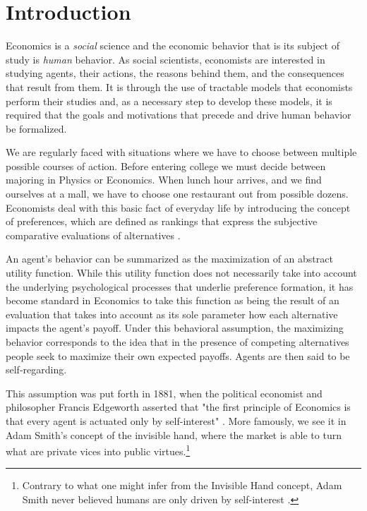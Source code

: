 \documentclass[12pt]{article}
\begin{document}



\newpage

\setcounter{page}{1} %
\section{Introduction}
Economics is a \textit{social} science and the economic behavior that is its subject of study is \textit{human} behavior. As social scientists, economists are interested in studying agents, their actions, the reasons behind them, and the consequences that result from them. It is through the use of tractable models that economists perform their studies and, as a necessary step to develop these models, it is required that the goals and motivations that precede and drive human behavior be formalized. 

We are regularly faced with situations where we have to choose between multiple possible courses of action. Before entering college we must decide between majoring in Physics or Economics. When lunch hour arrives, and we find ourselves at a mall, we have to choose one restaurant out from possible dozens. Economists deal with this basic fact of everyday life by introducing the concept of preferences, which are defined as rankings that express the subjective comparative evaluations of alternatives \citep{hausman2011preference}. 

An agent's behavior can be summarized as the maximization of an abstract utility function. While this utility function does not necessarily take into account the underlying psychological processes that underlie preference formation, it has become standard in Economics to take this function as being the result of an evaluation that takes into account as its sole parameter how each alternative impacts the agent's payoff. Under this behavioral assumption, the maximizing behavior corresponds to the idea that in the presence of competing alternatives people seek to maximize their own expected payoffs. Agents are then said to be self-regarding.

This assumption was put forth in 1881, when the political economist and philosopher Francis Edgeworth asserted that "the first principle of Economics is that every agent is actuated only by self-interest" \citep{edgeworth1881mathematical}. More famously, we see it in Adam Smith's concept of the invisible hand, where the market is able to turn what are private vices into public virtues.\footnote{Contrary to what one might infer from the Invisible Hand concept, Adam Smith never believed humans are only driven by self-interest \citep{smith1822theory}.} 
\end{document}
